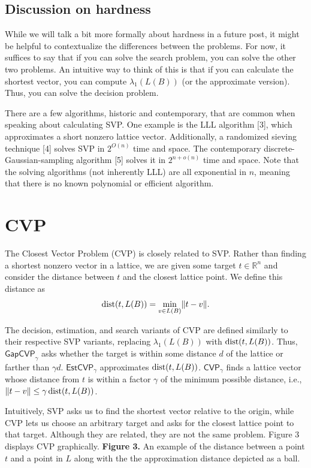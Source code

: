 \documentclass{article}
\begin{document}
\subsection{Discussion on hardness}
While we will talk a bit more formally about hardness in a future post, it might be helpful to contextualize the differences between the problems.
For now, it suffices to say that if you can solve the search problem, you can solve the other two problems.
An intuitive way to think of this is that if you can calculate the shortest vector, you can compute $\lambda_1(L(B))$ (or the approximate version).
Thus, you can solve the decision problem.

There are a few algorithms, historic and contemporary, that are common when speaking about calculating SVP.
One example is the LLL algorithm [3], which approximates a short nonzero lattice vector.
Additionally, a randomized sieving technique [4] solves SVP in $2^{O(n)}$ time and space. 
The contemporary discrete-Gaussian-sampling algorithm [5] solves it in $2^{n+o(n)}$ time and space.
Note that the solving algorithms (not inherently LLL) are all exponential in $n$, meaning that there is no known polynomial or efficient algorithm.



\section{CVP}
The Closest Vector Problem (CVP) is closely related to SVP.
Rather than finding a shortest nonzero vector in a lattice, we are given some target $t \in \mathbb{R}^n$ and consider the distance between $t$ and the closest lattice point.
We define this distance as
\[
\operatorname{dist}(t,L(B))
    =
    \min_{v \in L(B)} \lVert t-v \rVert.
\]

The decision, estimation, and search variants of CVP are defined similarly to their respective SVP variants, replacing $\lambda_1(L(B))$ with $\operatorname{dist}(t,L(B))$.
Thus, $\mathsf{GapCVP}_\gamma$ asks whether the target is within some distance $d$ of the lattice or farther than $\gamma d$.
$\mathsf{EstCVP}_\gamma$ approximates $\operatorname{dist}(t,L(B))$.
$\mathsf{CVP}_\gamma$ finds a lattice vector whose distance from $t$ is within a factor $\gamma$ of the minimum possible distance, i.e., $\lVert t-v \rVert \leq \gamma \operatorname{dist}(t,L(B))$.

Intuitively, SVP asks us to find the shortest vector relative to the origin, while CVP lets us choose an arbitrary target and asks for the closest lattice point to that target.
Although they are related, they are not the same problem.
Figure 3 displays CVP graphically.
{\textbf{Figure 3.} An example of the distance between a point $t$ and a point in $L$ along with the the approximation distance depicted as a ball.}
\end{document}
